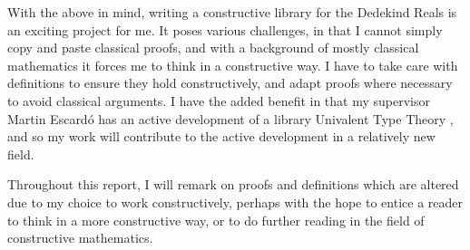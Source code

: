 \documentclass[ProjectReport]{subfiles}
\begin{document}
With the above in mind, writing a constructive library for the Dedekind Reals is an exciting project for me. It poses various challenges, in that I cannot simply copy and paste classical proofs, and with a background of mostly classical mathematics it forces me to think in a constructive way. I have to take care with definitions to ensure they hold constructively, and adapt proofs where necessary to avoid classical arguments. I have the added benefit in that my supervisor Martin Escard\'o has an active development of a library Univalent Type Theory \cite{TypeTopology}, and so my work will contribute to the active development in a relatively new field. 

Throughout this report, I will remark on proofs and definitions which are altered due to my choice to work constructively, perhaps with the hope to entice a reader to think in a more constructive way, or to do further reading in the field of constructive mathematics.
\end{document}
